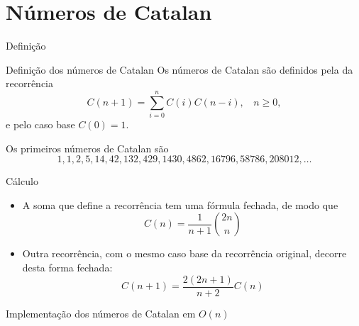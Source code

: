 \section{Números de Catalan}

\begin{frame}[fragile]{Definição}

    \begin{block}{Definição dos números de Catalan}
    Os números de Catalan são definidos pela da recorrência
    $$
        C(n + 1) = \sum_{i = 0}^n C(i)C(n - i),\ \ \ \ n \geq 0,
    $$
    e pelo caso base $C(0) = 1$.

    \end{block}

    Os primeiros números de Catalan são 
    $$
    1, 1, 2, 5, 14, 42, 132, 429, 1430, 4862, 16796, 58786, 208012, \ldots
    $$

\end{frame}

\begin{frame}[fragile]{Cálculo}

    \begin{itemize}
        \item A soma que define a recorrência tem uma fórmula fechada, de modo que
$$
    C(n) = \frac{1}{n + 1}\binom{2n}{n}
$$

        \item Outra recorrência, com o mesmo caso base da recorrência original, decorre desta forma fechada:
$$
    C(n + 1) = \frac{2(2n +1)}{n + 2}C(n)
$$
    \end{itemize}

\end{frame}

\begin{frame}[fragile]{Implementação dos números de Catalan em $O(n)$}
\end{frame}

